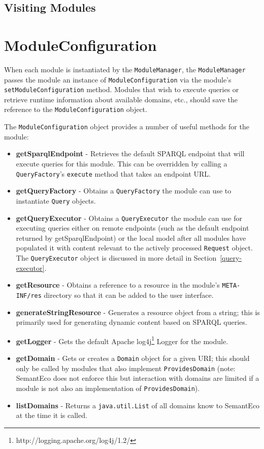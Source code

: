 \documentclass[letterpaper]{report}
\begin{document}
\subsection{Visiting Modules}

\section{ModuleConfiguration}
When each module is instantiated by the \texttt{ModuleManager}, the \texttt{ModuleManager} passes the module an instance of \texttt{ModuleConfiguration} via the module's \texttt{setModuleConfiguration} method. Modules that wish to execute queries or retrieve runtime information about available domains, etc., should save the reference to the \texttt{ModuleConfiguration} object.

The \texttt{ModuleConfiguration} object provides a number of useful methods for the module:

\begin{itemize}
\item\textbf{getSparqlEndpoint} - Retrieves the default SPARQL endpoint that will execute queries for this module. This can be overridden by calling a \texttt{QueryFactory}'s \texttt{execute} method that takes an endpoint URL.
\item\textbf{getQueryFactory} - Obtains a \texttt{QueryFactory} the module can use to instantiate \texttt{Query} objects.
\item\textbf{getQueryExecutor} - Obtains a \texttt{QueryExecutor} the module can use for executing queries either on remote endpoints (such as the default endpoint returned by getSparqlEndpoint) or the local model after all modules have populated it with content relevant to the actively processed \texttt{Request} object. The \texttt{QueryExecutor} object is discussed in more detail in Section~\ref{query-executor}.
\item\textbf{getResource} - Obtains a reference to a resource in the module's \texttt{META-INF/res} directory so that it can be added to the user interface.
\item\textbf{generateStringResource} - Generates a resource object from a string; this is primarily used for generating dynamic content based on SPARQL queries.
\item\textbf{getLogger} - Gets the default Apache log4j\footnote{http://logging.apache.org/log4j/1.2/} Logger for the module.
\item\textbf{getDomain} - Gets or creates a \texttt{Domain} object for a given URI; this should only be called by modules that also implement \texttt{ProvidesDomain} (note: SemantEco does not enforce this but interaction with domains are limited if a module is not also an implementation of \texttt{ProvidesDomain}).
\item\textbf{listDomains} - Returns a \texttt{java.util.List} of all domains know to SemantEco at the time it is called.
\end{itemize}
\end{document}
